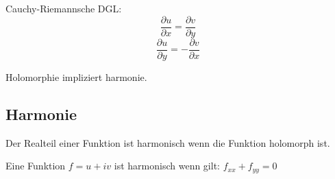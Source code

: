 \documentclass[10pt,a4paper]{article}
\begin{document}
Cauchy-Riemannsche DGL:
\[
\frac{\partial u}{\partial x} = \frac{\partial v}{\partial y}
\]\[
\frac{\partial u}{\partial y} = - \frac{\partial v}{\partial x}
\]

Holomorphie impliziert harmonie.

\subsection{Harmonie}
Der Realteil einer Funktion ist harmonisch wenn die Funktion holomorph ist.

Eine Funktion $f=u + iv$ ist harmonisch wenn gilt: $f_{xx} + f_{yy} = 0$
\end{document}
